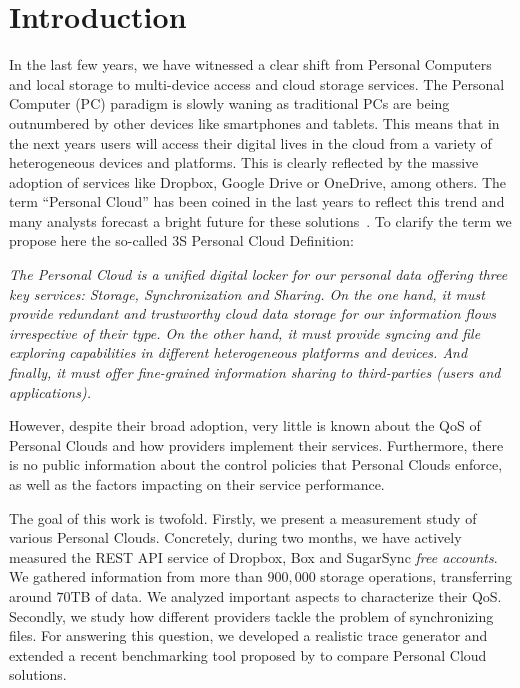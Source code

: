 \chapter{Introduction}

In the last few years, we have witnessed a clear shift from Personal Computers and local storage to multi-device access and cloud storage services. The Personal Computer (PC) paradigm is slowly waning as traditional PCs are being outnumbered by other devices like smartphones and tablets. This means that in the next years  users will access their digital lives in the cloud from a variety of heterogeneous devices and platforms. This is clearly reflected by the massive adoption of services like Dropbox, Google Drive or OneDrive, among others.  The term ``Personal Cloud'' has been coined in the last years to reflect this trend and many analysts forecast  a bright future for these solutions~\cite{forrester}\cite{gartner}. To clarify the term we propose here the so-called 3S Personal Cloud Definition:

\textit{The Personal Cloud is a unified digital  locker for our personal data offering three key services: Storage, Synchronization and Sharing.  On the one hand, it must provide redundant and trustworthy cloud data storage for our information flows irrespective of their type. On the other hand, it must provide syncing and file exploring capabilities in different heterogeneous platforms and devices. And finally, it must offer fine-grained information sharing to third-parties (users and applications).}

However, despite their broad adoption, very little is known
about the QoS of Personal Clouds and how providers implement their services. Furthermore,
there is no public information about the control policies that
Personal Clouds enforce, as well as the factors
impacting on their service performance.

The goal of this work is twofold. Firstly, we present a measurement study of various Personal Clouds.
Concretely, during two months, we have actively measured the REST API service of Dropbox, Box and SugarSync
\textit{free accounts}. We gathered information from more than $900,000$ storage operations, transferring
around $70$TB of data. We analyzed important aspects to characterize their QoS.
Secondly, we study how different providers tackle the problem of synchronizing files. For answering
this question, we developed a realistic trace generator and extended a recent benchmarking tool proposed by
\cite{drago2013benchmarking} to compare Personal Cloud solutions.

